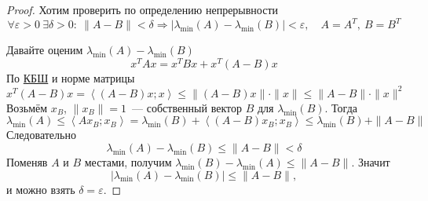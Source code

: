 

\begin{proof}
  Хотим проверить по определению непрерывности
  \[
  \forall \varepsilon >0\ \exists \delta > 0:\ \|A - B\| < \delta \Rightarrow |\lambda_{\min}(A) - \lambda_{\min}(B)| < \varepsilon,\quad A = A^T,\ B = B^T
  \]

  Давайте оценим $\lambda_{\min}(A) - \lambda_{\min}(B)$
  \[
  x^TAx = x^TBx + x^T(A-B)x
  \]
  По \hyperref[note:D0601ACD-8C91-4A93-B0E4-AC0D529C6A5C]{КБШ} и норме матрицы
  \[
  x^T(A-B)x = \left\langle (A-B)x; x \right\rangle \le \|(A-B)x\| \cdot \|x\| \le \|A-B\| \cdot \|x \|^2
  \]
  Возьмём $x_B$, $\|x_B\| = 1$~--- собственный вектор $B$ для $\lambda_{\min}(B)$. Тогда
  \[
  \lambda_{\min}(A) \le \left\langle Ax_B;x_B \right\rangle = \lambda_{\min}(B) + \left\langle (A-B)x_B;x_B \right\rangle \le \lambda_{\min}(B) + \|A-B\|
  \]
  Следовательно
  \[
  \lambda_{\min}(A) - \lambda_{\min}(B) \le \|A-B\| < \delta
  \]
  Поменяв $A$ и $B$ местами, получим $\lambda_{\min}(B) - \lambda_{\min}(A) \le \|A-B\|$. Значит
  \[|\lambda_{\min}(A) - \lambda_{\min}(B)| \le \|A-B\|,
  \]
  и можно взять $\delta = \varepsilon$.
\end{proof}
